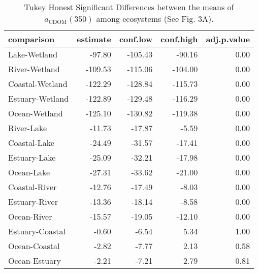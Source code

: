 \begin{table}[ht]
\centering
\begin{tabular}{lrrrr}
  \hline
comparison & estimate & conf.low & conf.high & adj.p.value \\ 
  \hline
Lake-Wetland & -97.80 & -105.43 & -90.16 & 0.00 \\ 
  River-Wetland & -109.53 & -115.06 & -104.00 & 0.00 \\ 
  Coastal-Wetland & -122.29 & -128.84 & -115.73 & 0.00 \\ 
  Estuary-Wetland & -122.89 & -129.48 & -116.29 & 0.00 \\ 
  Ocean-Wetland & -125.10 & -130.82 & -119.38 & 0.00 \\ 
  River-Lake & -11.73 & -17.87 & -5.59 & 0.00 \\ 
  Coastal-Lake & -24.49 & -31.57 & -17.41 & 0.00 \\ 
  Estuary-Lake & -25.09 & -32.21 & -17.98 & 0.00 \\ 
  Ocean-Lake & -27.31 & -33.62 & -21.00 & 0.00 \\ 
  Coastal-River & -12.76 & -17.49 & -8.03 & 0.00 \\ 
  Estuary-River & -13.36 & -18.14 & -8.58 & 0.00 \\ 
  Ocean-River & -15.57 & -19.05 & -12.10 & 0.00 \\ 
  Estuary-Coastal & -0.60 & -6.54 & 5.34 & 1.00 \\ 
  Ocean-Coastal & -2.82 & -7.77 & 2.13 & 0.58 \\ 
  Ocean-Estuary & -2.21 & -7.21 & 2.79 & 0.81 \\ 
   \hline
\end{tabular}
\caption{Tukey Honest Significant Differences between the means of $a_{\text{CDOM}}(350)$ among ecosystems (See Fig. 3A).} 
\end{table}
